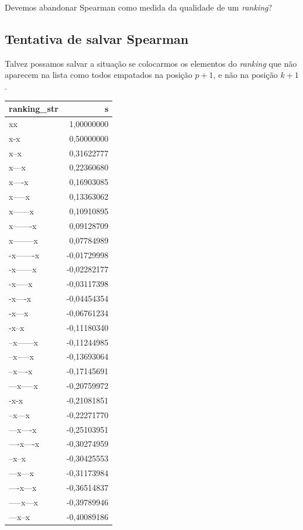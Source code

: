 \documentclass[
  letterpaper,
  DIV=11,
  numbers=noendperiod]{scrreprt}
\begin{document}
Devemos abandonar Spearman como medida da qualidade de um
\emph{ranking}?

\subsection{Tentativa de salvar
Spearman}\label{tentativa-de-salvar-spearman}

Talvez possamos salvar a situação se colocarmos os elementos do
\emph{ranking} que não aparecem na lista como todos empatados na posição
$p + 1$, e não na posição $k + 1$.

\begin{longtable*}{lr}
\toprule
ranking\_str & s \\ 
\midrule\addlinespace[2.5pt]
xx & 1,00000000 \\ 
x-x & 0,50000000 \\ 
x--x & 0,31622777 \\ 
x---x & 0,22360680 \\ 
x----x & 0,16903085 \\ 
x-----x & 0,13363062 \\ 
x------x & 0,10910895 \\ 
x-------x & 0,09128709 \\ 
x--------x & 0,07784989 \\ 
-x-------x & -0,01729998 \\ 
-x------x & -0,02282177 \\ 
-x-----x & -0,03117398 \\ 
-x----x & -0,04454354 \\ 
-x---x & -0,06761234 \\ 
-x--x & -0,11180340 \\ 
--x------x & -0,11244985 \\ 
--x-----x & -0,13693064 \\ 
--x----x & -0,17145691 \\ 
---x-----x & -0,20759972 \\ 
-x-x & -0,21081851 \\ 
--x---x & -0,22271770 \\ 
---x----x & -0,25103951 \\ 
----x----x & -0,30274959 \\ 
--x--x & -0,30425553 \\ 
---x---x & -0,31173984 \\ 
----x---x & -0,36514837 \\ 
-----x---x & -0,39789946 \\ 
---x--x & -0,40089186 \\ 

\end{longtable*}
\end{document}
